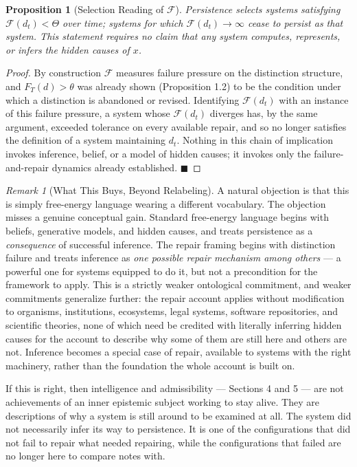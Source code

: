 \documentclass[11pt]{article}
\theoremstyle{plain}
\newtheorem{proposition}[theorem]{Proposition}
\theoremstyle{definition}
\theoremstyle{remark}
\newtheorem{remark}[theorem]{Remark}
\begin{document}
\begin{proposition}[Selection Reading of $\mathcal{F}$]
\label{prop:selection}
Persistence selects systems satisfying $\mathcal{F}(d_t) < \Theta$ over time; systems for which $\mathcal{F}(d_t) \to \infty$ cease to persist as that system. This statement requires no claim that any system computes, represents, or infers the hidden causes of $x$.
\end{proposition}
\begin{proof}
By construction $\mathcal{F}$ measures failure pressure on the distinction structure, and $F_T(d) > \theta$ was already shown (Proposition 1.2) to be the condition under which a distinction is abandoned or revised. Identifying $\mathcal{F}(d_t)$ with an instance of this failure pressure, a system whose $\mathcal{F}(d_t)$ diverges has, by the same argument, exceeded tolerance on every available repair, and so no longer satisfies the definition of a system maintaining $d_t$. Nothing in this chain of implication invokes inference, belief, or a model of hidden causes; it invokes only the failure-and-repair dynamics already established. $\blacksquare$
\end{proof}

\begin{remark}[What This Buys, Beyond Relabeling]
A natural objection is that this is simply free-energy language wearing a different vocabulary. The objection misses a genuine conceptual gain. Standard free-energy language begins with beliefs, generative models, and hidden causes, and treats persistence as a \emph{consequence} of successful inference. The repair framing begins with distinction failure and treats inference as \emph{one possible repair mechanism among others} --- a powerful one for systems equipped to do it, but not a precondition for the framework to apply. This is a strictly weaker ontological commitment, and weaker commitments generalize further: the repair account applies without modification to organisms, institutions, ecosystems, legal systems, software repositories, and scientific theories, none of which need be credited with literally inferring hidden causes for the account to describe why some of them are still here and others are not. Inference becomes a special case of repair, available to systems with the right machinery, rather than the foundation the whole account is built on.
\end{remark}

If this is right, then intelligence and admissibility --- Sections 4 and 5 --- are not achievements of an inner epistemic subject working to stay alive. They are descriptions of why a system is still around to be examined at all. The system did not necessarily infer its way to persistence. It is one of the configurations that did not fail to repair what needed repairing, while the configurations that failed are no longer here to compare notes with.
\end{document}
